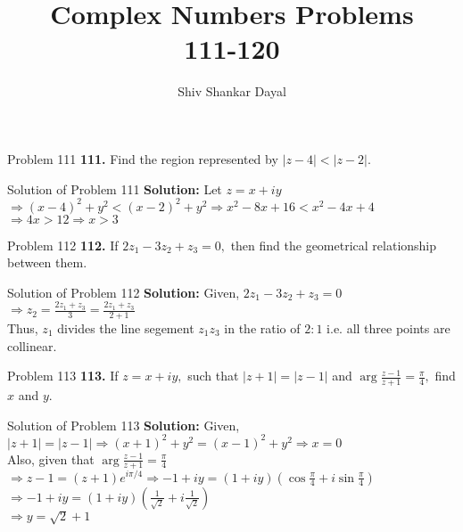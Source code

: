 \documentclass[aspectratio=169,8pt]{beamer}
\title{Complex Numbers Problems\\ 111-120}
\author[Shiv Shankar Dayal]{Shiv Shankar Dayal}
\begin{document}
\begin{frame}
  \titlepage
\end{frame}
\begin{frame}{Problem 111}
  \textbf{111.} Find the region represented by $|z - 4| < |z - 2|.$
\end{frame}
\begin{frame}{Solution of Problem 111}
  \textbf{Solution:} Let $z = x + iy$\\
  \vspace*{0.2cm}
  $\Rightarrow (x - 4)^2 + y^2 < (x - 2)^2 + y^2 \Rightarrow x^2 - 8x + 16 < x^2 - 4x + 4$\\
  \vspace*{0.2cm}
  $\Rightarrow 4x > 12 \Rightarrow x > 3$
\end{frame}
\begin{frame}{Problem 112}
  \textbf{112.} If $2z_1 - 3z_2 + z_3 = 0,$ then find the geometrical relationship between them.
\end{frame}
\begin{frame}{Solution of Problem 112}
  \textbf{Solution:} Given, $2z_1 - 3z_2 + z_3 = 0$\\
  \vspace*{0.2cm}
  $\Rightarrow z_2 = \frac{2z_1 + z_3}{3} = \frac{2z_1 + z_3}{2 + 1}$\\
  \vspace*{0.2cm}
  Thus, $z_1$ divides the line segement $z_1z_3$ in the ratio of $2:1$ i.e. all three points are collinear.
\end{frame}
\begin{frame}{Problem 113}
  \textbf{113.} If $z = x + iy,$ such that $|z + 1| = |z - 1|$ and $\arg\frac{z - 1}{z + 1} = \frac{\pi}{4},$ find $x$ and $y.$
\end{frame}
\begin{frame}{Solution of Problem 113}
  \textbf{Solution:} Given, $|z + 1| = |z - 1| \Rightarrow (x + 1)^2 + y^2 = (x - 1)^2 + y^2 \Rightarrow x = 0$\\
  \vspace*{0.2cm}
  Also, given that $\arg\frac{z - 1}{z + 1} = \frac{\pi}{4}$\\
  \vspace*{0.2cm}
  $\Rightarrow z - 1 = (z + 1)e^{i\pi/4} \Rightarrow -1 + iy = (1 + iy)\left(\cos\frac{\pi}{4} + i\sin\frac{\pi}{4}\right)$\\
  \vspace*{0.2cm}
  $\Rightarrow -1 + iy = (1 + iy)\left(\frac{1}{\sqrt{2}} + i\frac{1}{\sqrt{2}}\right)$\\
  \vspace*{0.2cm}
  $\Rightarrow y = \sqrt{2} + 1$
\end{frame}
\end{document}
